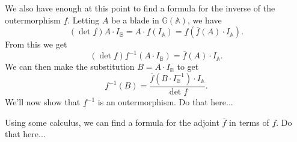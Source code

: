 \documentclass[12pt]{article}
\newcommand{\G}{\mathbb{G}}
\newcommand{\A}{\mathbb{A}}
\newcommand{\B}{\mathbb{B}}
\newcommand{\ob}{\overline}
\newcommand{\ub}{\underline}
\begin{document}
We also have enough at this point to find a formula for the inverse of
the outermorphism $\ub{f}$.  Letting $A$ be a blade in $\G(\A)$,
we have
\begin{equation*}
(\det\ub{f})A\cdot I_{\B} = A\cdot\ub{f}(I_{\A}) = \ub{f}(\ob{f}(A)\cdot I_{\A}).
\end{equation*}
From this we get
\begin{equation*}
(\det\ub{f})\ub{f}^{-1}(A\cdot I_{\B}) = \ob{f}(A)\cdot I_{\A}.
\end{equation*}
We can then make the substitution $B=A\cdot I_{\B}$ to get
\begin{equation}\label{equ_inv_of_outermorphism}
\ub{f}^{-1}(B) = \frac{\ob{f}(B\cdot I^{-1}_{\B})\cdot I_{\A}}{\det\ub{f}}.
\end{equation}
We'll now show that $\ub{f}^{-1}$ is an outermorphism.  Do that here...

Using some calculus, we can find a formula for the adjoint $\ob{f}$ in terms of $\ub{f}$.  Do that here...
\end{document}
